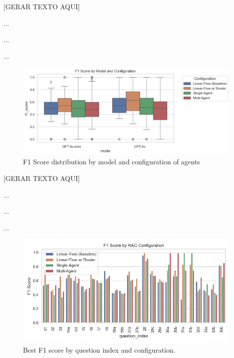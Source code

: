                 
                [GERAR TEXTO AQUI]

                ...

                ...

                ...
                
                \begin{figure}
                    \includegraphics[width=1.1\linewidth]{images_exp2/f1_score_by_model_and_configuration.png}
                    \caption{F1 Score distribution by model and configuration of agents}
                    \label{fig:f1_score_by_model_and_configuration}
                \end{figure}
                    
                [GERAR TEXTO AQUI]

                ...

                ...

                ...
                
                
                \begin{figure}
                    \centering
                    \includegraphics[width=1\linewidth]{images_exp2/best_f1_by_question_index_and_configuration.png}
                    \caption{Best F1 score by question index and configuration.}
                    \label{fig:best_f1_by_question_index_and_configuration}
                \end{figure}
                
